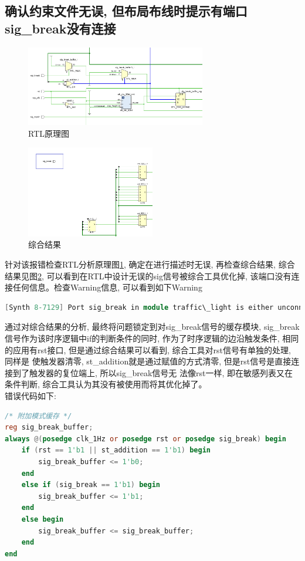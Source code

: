 \documentclass{article}
\begin{document}
\subsection*{确认约束文件无误, 但布局布线时提示有端口sig\_break没有连接}
\begin{figure}[H]
    \centering
    \includegraphics[width=0.7\textwidth]{image/2024-06-19-17-41-30.png}
    \caption{RTL原理图}
    \label{image_QA_1}
\end{figure}
\begin{figure}[htbp]
    \centering
    \includegraphics[width=0.5\textwidth]{image/2024-06-19-17-44-00.png}
    \caption{综合结果}
    \label{image_QA_2}
\end{figure}
针对该报错检查RTL分析原理图\ref{image_QA_1}, 确定在进行描述时无误, 再检查综合结果, 综合结果见图\ref{image_QA_2}, 
可以看到在RTL中设计无误的sig信号被综合工具优化掉, 该端口没有连接任何信息。检查Warning信息, 可以看到如下Warning\\
\begin{lstlisting}[language=Verilog]
[Synth 8-7129] Port sig_break in module traffic\_light is either unconnected or has no load
\end{lstlisting}
通过对综合结果的分析, 最终将问题锁定到对sig\_break信号的缓存模块, sig\_break信号作为该时序逻辑中if的判断条件的同时,
 作为了时序逻辑的边沿触发条件, 相同的应用有rst接口, 但是通过综合结果可以看到, 综合工具对rst信号有单独的处理, 同样是
 使触发器清零, st\_addition就是通过赋值的方式清零, 但是rst信号是直接连接到了触发器的复位端上, 所以sig\_break信号无
 法像rst一样, 即在敏感列表又在条件判断, 综合工具认为其没有被使用而将其优化掉了。\\
 \newpage
 错误代码如下:
\begin{lstlisting}[language=Verilog, caption={综合不理想代码}]
/* 附加模式缓存 */
reg sig_break_buffer;
always @(posedge clk_1Hz or posedge rst or posedge sig_break) begin
    if (rst == 1'b1 || st_addition == 1'b1) begin
        sig_break_buffer <= 1'b0;
    end
    else if (sig_break == 1'b1) begin
        sig_break_buffer <= 1'b1;
    end
    else begin
        sig_break_buffer <= sig_break_buffer;
    end
end
\end{lstlisting}
\end{document}
